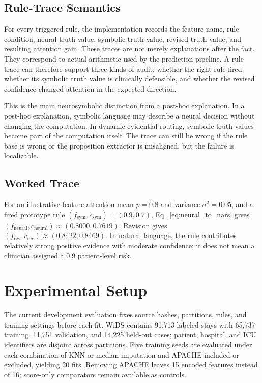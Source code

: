 \documentclass{article}
\begin{document}
\subsection{Rule-Trace Semantics}

For every triggered rule, the implementation records the feature name, rule condition, neural truth value, symbolic truth value, revised truth value, and resulting attention gain. These traces are not merely explanations after the fact. They correspond to actual arithmetic used by the prediction pipeline. A rule trace can therefore support three kinds of audit: whether the right rule fired, whether its symbolic truth value is clinically defensible, and whether the revised confidence changed attention in the expected direction.

This is the main neurosymbolic distinction from a post-hoc explanation. In a post-hoc explanation, symbolic language may describe a neural decision without changing the computation. In dynamic evidential routing, symbolic truth values become part of the computation itself. The trace can still be wrong if the rule base is wrong or the proposition extractor is misaligned, but the failure is localizable.

\subsection{Worked Trace}

For an illustrative feature attention mean $p=0.8$ and variance $\sigma^2=0.05$, and a fired prototype rule $(f_{\text{sym}},c_{\text{sym}})=(0.9,0.7)$, Eq.~\eqref{eq:neural_to_nars} gives $(f_{\text{neural}},c_{\text{neural}})\approx(0.8000,0.7619)$. Revision gives $(f_{\text{rev}},c_{\text{rev}})\approx(0.8422,0.8469)$. In natural language, the rule contributes relatively strong positive evidence with moderate confidence; it does not mean a clinician assigned a 0.9 patient-level risk.

\section{Experimental Setup}
\label{sec:experiments}

The current development evaluation fixes source hashes, partitions, rules, and training settings before each fit. WiDS contains 91,713 labeled stays with 65,737 training, 11,751 validation, and 14,225 held-out cases; patient, hospital, and ICU identifiers are disjoint across partitions. Five training seeds are evaluated under each combination of KNN or median imputation and APACHE included or excluded, yielding 20 fits. Removing APACHE leaves 15 encoded features instead of 16; score-only comparators remain available as controls.
\end{document}
